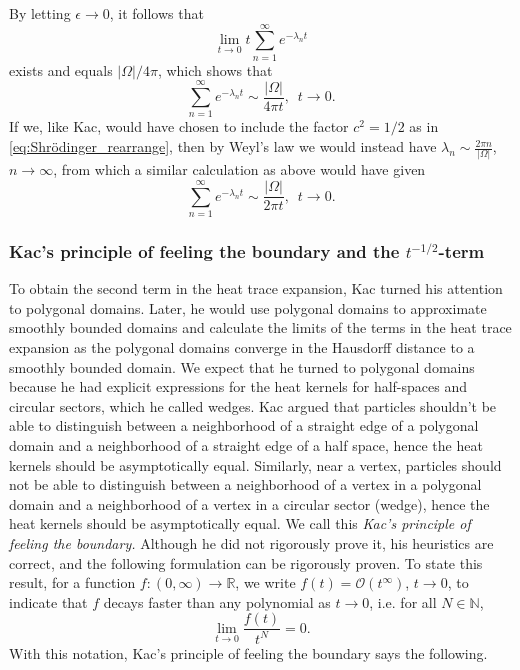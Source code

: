 \documentclass{amsart}
\theoremstyle{definition}
\newcommand*{\R}{\mathbb{R}}
\newcommand*{\N}{\mathbb{N}}
\begin{document}
By letting $\epsilon \to 0$, it follows that 
\begin{equation*}
    \lim_{t \to 0} t\sum_{n=1}^\infty e^{-\lambda_n t}
\end{equation*}
exists and equals $|\Omega|/4\pi$, which shows that 
\begin{equation*}
    \sum_{n=1}^\infty e^{-\lambda_n t} \sim \frac{|\Omega|}{4\pi t}, \,\,\,t \to 0.
\end{equation*}
If we, like Kac, would have chosen to include the factor $c^2 = 1/2$ as in \eqref{eq:Shrödinger_rearrange}, then by Weyl's law we would instead have $\lambda_n \sim \frac{2\pi n}{|\Omega|}$, $n \to \infty$, from which a similar calculation as above would have given
\begin{equation*}
    \sum_{n=1}^\infty e^{-\lambda_n t} \sim \frac{|\Omega|}{2\pi t}, \,\,\,t \to 0.
\end{equation*}

\subsubsection{Kac's principle of \textbf{feeling the boundary} and the $t^{-1/2}$-term} \label{sec:locality_principle}
To obtain the second term in the heat trace expansion, Kac turned his attention to polygonal domains.  Later, he would use polygonal domains to approximate smoothly bounded domains and calculate the limits of the terms in the heat trace expansion as the polygonal domains converge in the Hausdorff distance to a smoothly bounded domain.  We expect that he turned to polygonal domains because he had explicit expressions for the heat kernels for half-spaces and circular sectors, which he called wedges.  Kac argued that particles shouldn't be able to distinguish between a neighborhood of a straight edge of a polygonal domain and a neighborhood of a straight edge of a half space, hence the heat kernels should be asymptotically equal.  Similarly, near a vertex, particles should not be able to distinguish between a neighborhood of a vertex in a polygonal domain and a neighborhood of a vertex in a circular sector (wedge), hence the heat kernels should be asymptotically equal.  We call this \textit{Kac's principle of feeling the boundary.}  Although he did not rigorously prove it, his heuristics are correct, and the following formulation can be rigorously proven.  To state this result, for a function $f : (0,\infty) \to \R$, we write $f(t) = \mathcal{O}(t^\infty)$, $t \to 0$, to indicate that $f$ decays faster than any polynomial as $t \to 0$, i.e. for all $N \in \N$,
\begin{equation*}
    \lim_{t \to 0} \frac{f(t)}{t^N} = 0.
\end{equation*}
With this notation, Kac's principle of feeling the boundary says the following. 
\end{document}
